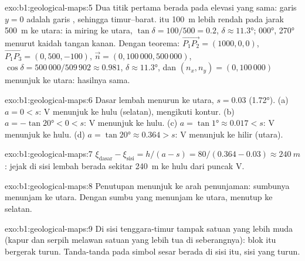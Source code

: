 \begin{solution}{exo:b1:geological-maps:5}
Dua titik pertama berada pada elevasi yang sama: garis $y = 0$ adalah garis , sehingga  timur--barat.  itu \qty{100}{m} lebih rendah pada jarak \qty{500}{m} ke utara: ia miring ke utara, $\tan\delta = 100/500 = 0.2$, $\delta \approx \ang{11.3}$;  \ang{000},  \ang{270} menurut kaidah tangan kanan. Dengan teorema: $\overrightarrow{P_1P_2} = (1000, 0, 0)$,
$\overrightarrow{P_1P_3} = (0, 500, -100)$, $\vec n = (0, 100\,000,
500\,000)$, $\cos\delta = 500\,000/509\,902 \approx 0.981$, $\delta \approx
\ang{11.3}$, dan $(n_x, n_y) = (0, 100\,000)$ menunjuk ke utara: hasilnya sama.
\end{solution}

\begin{solution}{exo:b1:geological-maps:6}
Dasar lembah menurun ke utara, $s = 0.03$ (\ang{1.72}). (a) $a = 0 < s$: V menunjuk ke hulu (selatan), mengikuti kontur. (b) $a = -\tan\ang{20} < 0 < s$: V menunjuk ke hulu. (c) $a = \tan\ang{1} \approx 0.017 < s$: V menunjuk ke hulu. (d) $a = \tan\ang{20}
\approx 0.364 > s$: V menunjuk ke hilir (utara).
\end{solution}

\begin{solution}{exo:b1:geological-maps:7}
$\xi_{\text{dasar}} - \xi_{\text{sisi}} = h/(a - s) = 80/(0.364 - 0.03)
\approx \qty{240}{m}$: jejak di sisi lembah berada sekitar \qty{240}{m} ke hulu dari puncak V.
\end{solution}

\begin{solution}{exo:b1:geological-maps:8}
Penutupan  menunjuk ke arah penunjaman: sumbunya menunjam ke utara. Dengan sumbu yang menunjam ke utara,   menutup ke selatan.
\end{solution}

\begin{solution}{exo:b1:geological-maps:9}
Di sisi tenggara-timur tampak satuan yang lebih muda (kapur dan serpih melawan satuan yang lebih tua di seberangnya): blok itu bergerak turun. Tanda-tanda pada simbol sesar berada di sisi itu, sisi yang turun.
\end{solution}

